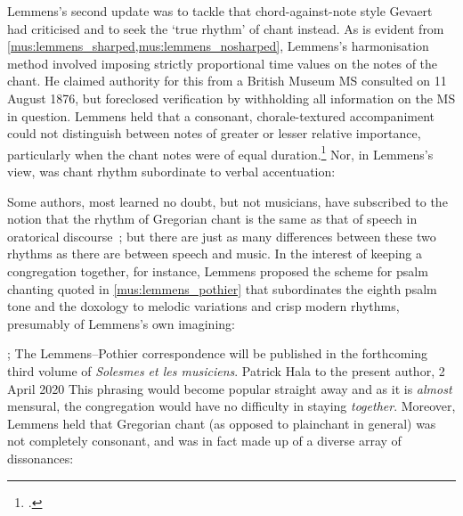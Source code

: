 Lemmens's second update was to tackle that chord-against-note style Gevaert had criticised and to seek the `true rhythm' of chant instead.
As is evident from \cref{mus:lemmens_sharped,mus:lemmens_nosharped}, Lemmens's harmonisation method involved imposing strictly proportional time values on the notes of the chant.
%
He claimed authority for this from a British Museum MS consulted on 11 August 1876, but foreclosed verification by withholding all information on the MS in question.
Lemmens held that a consonant, chorale-textured accompaniment could not distinguish between notes of greater or lesser relative importance, particularly when the chant notes were of equal duration.\footcite[1--2]{LemmensChantsliturgiques1884}
Nor, in Lemmens's view, was chant rhythm subordinate to verbal accentuation:
\pagebreak{}

  {\cite[61]{Lemmenschantgregoriensa1886}}
{Some authors, most learned no doubt, but not musicians, have subscribed to the notion that the rhythm of Gregorian chant is the same as that of speech in oratorical discourse~; but there are just as many differences between these two rhythms as there are between speech and music.}
\noindent
In the interest of keeping a congregation together, for instance, Lemmens proposed the scheme for psalm chanting quoted in \cref{mus:lemmens_pothier} that subordinates the eighth psalm tone and the doxology to melodic variations and crisp modern rhythms, presumably of Lemmens's own imagining:

  {; The Lemmens--Pothier correspondence will be published in the forthcoming third volume of \emph{Solesmes et les musiciens}. Patrick Hala to the present author, 2 April 2020}
{This phrasing would become popular straight away and as it is \emph{almost} mensural, the congregation would have no difficulty in staying \emph{together}.}
\noindent
Moreover, Lemmens held that Gregorian chant (as opposed to plainchant in general) was not completely consonant, and was in fact made up of a diverse array of dissonances:

